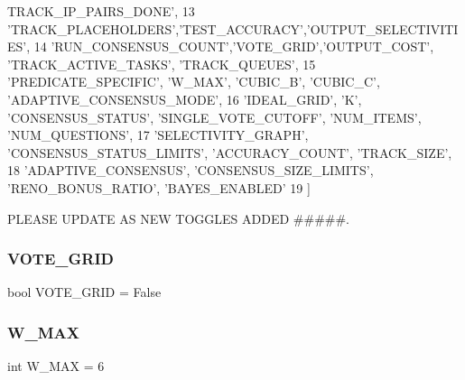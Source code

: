 \begin{DoxyCode}
{      TRACK\_IP\_PAIRS\_DONE'},
13             \textcolor{stringliteral}{'TRACK\_PLACEHOLDERS'},\textcolor{stringliteral}{'TEST\_ACCURACY'},\textcolor{stringliteral}{'OUTPUT\_SELECTIVITIES'},
14             \textcolor{stringliteral}{'RUN\_CONSENSUS\_COUNT'},\textcolor{stringliteral}{'VOTE\_GRID'},\textcolor{stringliteral}{'OUTPUT\_COST'}, \textcolor{stringliteral}{'TRACK\_ACTIVE\_TASKS'}, \textcolor{stringliteral}{'TRACK\_QUEUES'},
15             \textcolor{stringliteral}{'PREDICATE\_SPECIFIC'}, \textcolor{stringliteral}{'W\_MAX'}, \textcolor{stringliteral}{'CUBIC\_B'}, \textcolor{stringliteral}{'CUBIC\_C'}, \textcolor{stringliteral}{'ADAPTIVE\_CONSENSUS\_MODE'},
16             \textcolor{stringliteral}{'IDEAL\_GRID'}, \textcolor{stringliteral}{'K'}, \textcolor{stringliteral}{'CONSENSUS\_STATUS'}, \textcolor{stringliteral}{'SINGLE\_VOTE\_CUTOFF'}, \textcolor{stringliteral}{'NUM\_ITEMS'}, \textcolor{stringliteral}{'NUM\_QUESTIONS'},
17             \textcolor{stringliteral}{'SELECTIVITY\_GRAPH'}, \textcolor{stringliteral}{'CONSENSUS\_STATUS\_LIMITS'}, \textcolor{stringliteral}{'ACCURACY\_COUNT'}, \textcolor{stringliteral}{'TRACK\_SIZE'},
18             \textcolor{stringliteral}{'ADAPTIVE\_CONSENSUS'}, \textcolor{stringliteral}{'CONSENSUS\_SIZE\_LIMITS'}, \textcolor{stringliteral}{'RENO\_BONUS\_RATIO'}, \textcolor{stringliteral}{'BAYES\_ENABLED'}
19 ]
\end{DoxyCode}


P\+L\+E\+A\+SE U\+P\+D\+A\+TE AS N\+EW T\+O\+G\+G\+L\+ES A\+D\+D\+ED \#\#\#\#\#. 

\mbox{\label{namespacereorder_abd2acb6c03d6ca650537592475fc69e4}} 
\subsubsection{\texorpdfstring{V\+O\+T\+E\+\_\+\+G\+R\+ID}{VOTE\_GRID}}
{\footnotesize\ttfamily bool V\+O\+T\+E\+\_\+\+G\+R\+ID = False}

\mbox{\label{namespacereorder_add63171ca968cbd5ca4d60dfbf9a2746}} 
\subsubsection{\texorpdfstring{W\+\_\+\+M\+AX}{W\_MAX}}
{\footnotesize\ttfamily int W\+\_\+\+M\+AX = 6}

